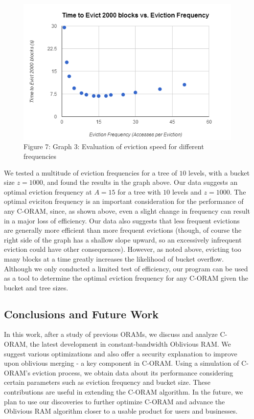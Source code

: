 \documentclass[12pt, oneside]{article}   	%
\begin{document}
\begin{figure}[H]
  \includegraphics[width=\linewidth]{evictionfreqgraph}
  \caption{Figure 7: Graph 3: Evaluation of eviction speed for different frequencies}
  \label{fig:evictionfreqgraph}
\end{figure}


We tested a multitude of eviction frequencies for a tree of $10$ levels, with a bucket size $z = 1000$, and found the results in the graph above. Our data suggests an optimal eviction frequency at $A=15$ for a tree with $10$ levels and $z = 1000$. The optimal eviciton frequency is an important consideration for the performance of any C-ORAM, since, as shown above, even a slight change in frequency can result in a major loss of efficiency. Our data also suggests that less frequent evictions are generally more efficient than more frequent evictions (though, of course the right side of the graph has a shallow slope upward, so an excessively infrequent eviction could have other consequences). However, as noted above, evicting too many blocks at a time greatly increases the likelihood of bucket overflow. Although we only conducted a limited test of efficiency, our program can be used as a tool to determine the optimal eviction frequency for any C-ORAM given the bucket and tree sizes.

\subsection{Conclusions and Future Work}
In this work, after a study of previous ORAMs, we discuss and analyze C-ORAM, the latest development in constant-bandwidth Oblivious RAM. We suggest various optimizations and also offer a security explanation to improve upon oblivious merging - a key component in C-ORAM. Using a simulation of C-ORAM's eviction process, we obtain data about its performance considering certain parameters such as eviction frequency and bucket size. These contributions are useful in extending the C-ORAM algorithm. In the future, we plan to use our discoveries to further optimize C-ORAM and advance the Oblivious RAM algorithm closer to a usable product for users and businesses.




\end{document}
